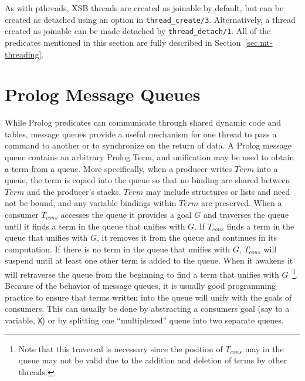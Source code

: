 %
As with pthreads, XSB threads are created as joinable by default, but
can be created as detached using an option in {\tt thread\_create/3}.
Alternatively, a thread created as joinable can be made detached by
{\tt thread\_detach/1}.  All of the predicates mentioned in this
section are fully described in Section~\ref{sec:mt-threading}.

\section{Prolog Message Queues}
%
While Prolog predicates can communicate through shared dynamic code
and tables, message queues provide a useful mechanism for one thread
to pass a command to another or to synchronize on the return of data.
A Prolog message queue contains an arbitrary Prolog Term, and
unification may be used to obtain a term from a queue.  More
specifically, when a producer writes $Term$ into a queue, the term is
copied into the queue so that no binding are shared between $Term$ and
the producer's stacks.  $Term$ may include structures or lists and
need not be bound, and any variable bindings within $Term$ are
preserved.  When a consumer $T_{cons}$ accesses the queue it provides
a goal $G$ and traverses the queue until it finds a term in the queue
that unifies with $G$.  If $T_{cons}$ finds a term in the queue that
unifies with $G$, it removes it from the queue and continues in its
computation.  If there is no term in the queue that unifies with $G$,
$T_{cons}$ will suspend until at least one other term is added to the
queue.  When it awakens it will retraverse the queue from the
beginning to find a term that unifies with $G$~\footnote{Note that
  this traversal is necessary since the position of $T_{cons}$ may in
  the queue may not be valid due to the addition and deletion of terms
  by other threads.}.  Because of the behavior of message queues, it
is usually good programming practice to ensure that terms written into
the queue will unify with the goals of consumers.  This can usually be
done by abstracting a consumers goal (say to a variable, {\tt X}) or
by splitting one ``multiplexed'' queue into two separate queues.


